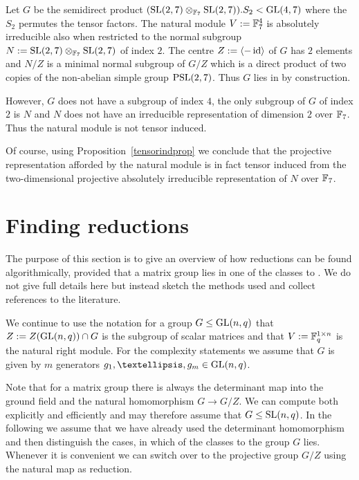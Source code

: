 \begin{Rem}
    \label{nottensorind}
%
    Let $G$ be the semidirect product 
    $(\SL(2,7) \otimes_{\F_7} \SL(2,7)).S_2 < \GL(4,7)$ where the
    $S_2$ permutes the tensor factors. The natural module $V := \mathbb{F}_7^4$ is
    absolutely irreducible also when restricted to the normal subgroup
    $N := \SL(2,7) \otimes_{\F_7} \SL(2,7)$ of index $2$. The centre 
    $Z := \left< -\id \right>$ of $G$ has $2$ elements and $N/Z$ is a
    minimal normal subgroup of $G/Z$ which is a direct product of two
    copies of the non-abelian simple group $\PSL(2,7)$. Thus $G$ lies
    in  by construction.

    However, $G$ does not have a subgroup of index $4$, the only 
    subgroup of $G$ of index $2$ is $N$ and $N$ does
    not have an irreducible representation of dimension $2$ over
    $\mathbb{F}_7$. Thus the natural module is not tensor induced.

    Of course, using Proposition~\ref{tensorindprop} we conclude that
    the projective representation afforded by the natural module is in
    fact tensor induced from the two-dimensional projective
    absolutely irreducible representation of $N$ over $\mathbb{F}_7$.
\end{Rem}

\section{Finding reductions}
\label{findred}
%

The purpose of this section is to give an overview of how reductions can
be found algorithmically, provided that a matrix group
lies in one of the classes  to . We do not give full details
here but instead sketch the methods used and collect references to the
literature.

We continue to use the notation for a group $G \le \GL(n,q)$ that
$Z := Z(\GL(n,q)) \cap G$ is the subgroup of scalar matrices and that
$V := \mathbb{F}_q^{1 \times n}$ is the natural right module. For the
complexity statements we assume that $G$ is given by $m$ generators
$g_1, \ldots, g_m \in \GL(n,q)$.

Note that for a matrix group there is always the determinant map
into the ground field and the natural homomorphism
$G \to G/Z$. We can compute both explicitly and efficiently and may
therefore assume that $G \le \SL(n,q)$.
In the following we assume that we have already used the determinant
homomorphism and then distinguish the cases, in which of the classes
 to  the group $G$ lies. Whenever it is convenient we can
switch over to the projective group $G/Z$ using the natural map 
as reduction.

